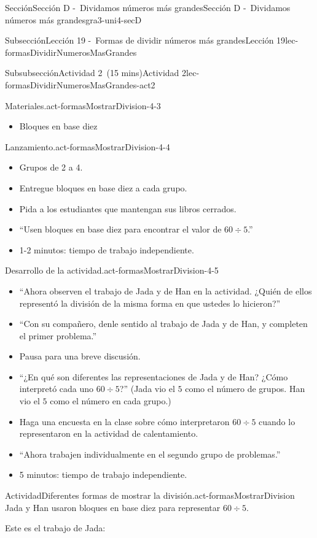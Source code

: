 \documentclass[oneside,10pt,]{article}
\begin{document}
\begin{sectionptx}{Sección}{Sección D -~Dividamos números más grandes}{}{Sección D -~Dividamos números más grandes}{}{}{gra3-uni4-secD}
\begin{subsectionptx}{Subsección}{Lección 19 -~Formas de dividir números más grandes}{}{Lección 19}{}{}{lec-formasDividirNumerosMasGrandes}
\begin{subsubsectionptx}{Subsubsección}{Actividad 2~(15 mins)}{}{Actividad 2}{}{}{lec-formasDividirNumerosMasGrandes-act2}
\begin{paragraphs}{Materiales.}{act-formasMostrarDivision-4-3}
\begin{itemize}[label=\textbullet]
\item{}Bloques en base diez%
\end{itemize}
\end{paragraphs}%
\begin{paragraphs}{Lanzamiento.}{act-formasMostrarDivision-4-4}%
%
\begin{itemize}[label=\textbullet]
\item{}Grupos de 2 a 4.%
\item{}Entregue bloques en base diez a cada grupo.%
\item{}Pida a los estudiantes que mantengan sus libros cerrados.%
\item{}``Usen bloques en base diez para encontrar el valor de \(60 \div 5\).''%
\item{}1-2 minutos: tiempo de trabajo independiente.%
\end{itemize}
\end{paragraphs}%
\begin{paragraphs}{Desarrollo de la actividad.}{act-formasMostrarDivision-4-5}%
%
\begin{itemize}[label=\textbullet]
\item{}``Ahora observen el trabajo de Jada y de Han en la actividad. ¿Quién de ellos representó la división de la misma forma en que ustedes lo hicieron?''%
\item{}``Con su compañero, denle sentido al trabajo de Jada y de Han, y completen el primer problema.''%
\item{}Pausa para una breve discusión.%
\item{}``¿En qué son diferentes las representaciones de Jada y de Han? ¿Cómo interpretó cada uno \(60 \div 5\)?'' (Jada vio el \(5\) como el número de grupos. Han vio el \(5\) como el número en cada grupo.)%
\item{}Haga una encuesta en la clase sobre cómo interpretaron \(60 \div 5\) cuando lo representaron en la actividad de calentamiento.%
\item{}``Ahora trabajen individualmente en el segundo grupo de problemas.''%
\item{}5 minutos: tiempo de trabajo independiente.%
\end{itemize}
\end{paragraphs}%
\begin{activity}{Actividad}{Diferentes formas de mostrar la división.}{act-formasMostrarDivision}%
Jada y Han usaron bloques en base diez para representar \(60 \div 5\).%
\par
Este es el trabajo de Jada:%

\end{activity}
\end{subsubsectionptx}
\end{subsectionptx}
\end{sectionptx}
\end{document}
